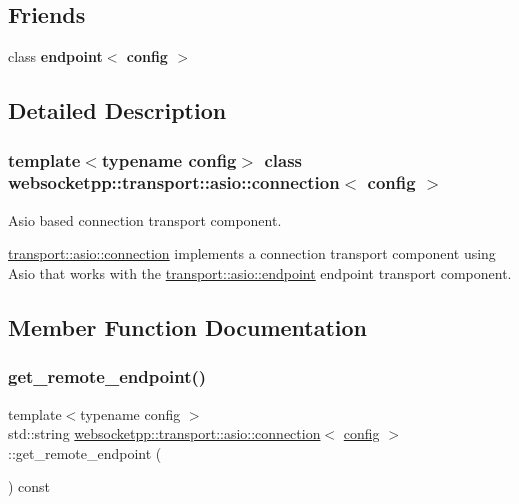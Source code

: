 \subsection*{Friends}
\begin{DoxyCompactItemize}
\item 
\mbox{\label{classwebsocketpp_1_1transport_1_1asio_1_1connection_ad7f0fad4f6837f8f4e97cf905b3a231f}} 
class {\bfseries endpoint$<$ config $>$}
\end{DoxyCompactItemize}


\subsection{Detailed Description}
\subsubsection*{template$<$typename config$>$\newline
class websocketpp\+::transport\+::asio\+::connection$<$ config $>$}

Asio based connection transport component. 

\mbox{\hyperlink{classwebsocketpp_1_1transport_1_1asio_1_1connection}{transport\+::asio\+::connection}} implements a connection transport component using Asio that works with the \mbox{\hyperlink{classwebsocketpp_1_1transport_1_1asio_1_1endpoint}{transport\+::asio\+::endpoint}} endpoint transport component. 

\subsection{Member Function Documentation}
\mbox{\label{classwebsocketpp_1_1transport_1_1asio_1_1connection_ac16d6ae60ee14176130dc92d12a30b61}} 
\subsubsection{\texorpdfstring{get\+\_\+remote\+\_\+endpoint()}{get\_remote\_endpoint()}}
{\footnotesize\ttfamily template$<$typename config $>$ \\
std\+::string \mbox{\hyperlink{classwebsocketpp_1_1transport_1_1asio_1_1connection}{websocketpp\+::transport\+::asio\+::connection}}$<$ \mbox{\hyperlink{classconfig}{config}} $>$\+::get\+\_\+remote\+\_\+endpoint (\begin{DoxyParamCaption}{ }\end{DoxyParamCaption}) const\hspace{0.3cm}{\ttfamily [inline]}}



